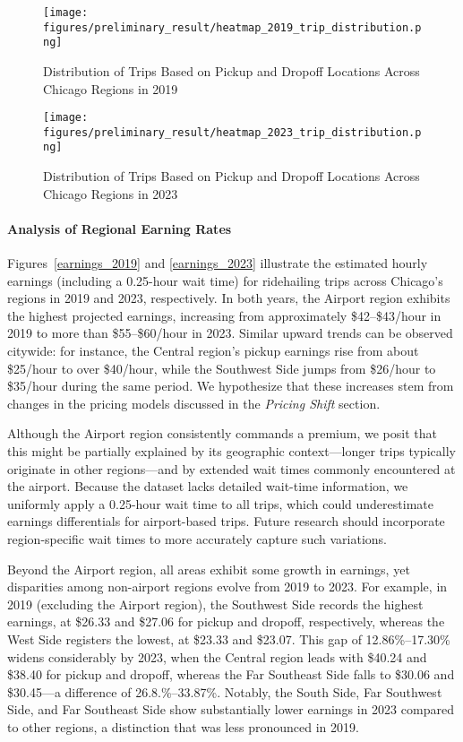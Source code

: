 \begin{figure}[h]
  \centering
  \label{distribution_2019}
  \texttt{[image: figures/preliminary\_result/heatmap\_2019\_trip\_distribution.png]}
  \caption{Distribution of Trips Based on Pickup and Dropoff Locations Across Chicago Regions in 2019}
\end{figure}

\begin{figure}[h]
  \centering
\label{distribution_2023}
  \texttt{[image: figures/preliminary\_result/heatmap\_2023\_trip\_distribution.png]}
  \caption{Distribution of Trips Based on Pickup and Dropoff Locations Across Chicago Regions in 2023}
\end{figure}
\paragraph{Analysis of Regional Earning Rates}
Figures~\ref{earnings_2019} and \ref{earnings_2023} illustrate the estimated hourly earnings (including a 0.25-hour wait time) for ridehailing trips across Chicago’s regions in 2019 and 2023, respectively. In both years, the Airport region exhibits the highest projected earnings, increasing from approximately \$42--\$43/hour in 2019 to more than \$55--\$60/hour in 2023. Similar upward trends can be observed citywide: for instance, the Central region’s pickup earnings rise from about \$25/hour to over \$40/hour, while the Southwest Side jumps from \$26/hour to \$35/hour during the same period. We hypothesize that these increases stem from changes in the pricing models discussed in the \emph{Pricing Shift} section.

Although the Airport region consistently commands a premium, we posit that this might be partially explained by its geographic context—longer trips typically originate in other regions—and by extended wait times commonly encountered at the airport. Because the dataset lacks detailed wait-time information, we uniformly apply a 0.25-hour wait time to all trips, which could underestimate earnings differentials for airport-based trips. Future research should incorporate region-specific wait times to more accurately capture such variations.

Beyond the Airport region, all areas exhibit some growth in earnings, yet disparities among non-airport regions evolve from 2019 to 2023. For example, in 2019 (excluding the Airport region), the Southwest Side records the highest earnings, at \$26.33 and \$27.06 for pickup and dropoff, respectively, whereas the West Side registers the lowest, at \$23.33 and \$23.07. This gap of 12.86\%--17.30\% widens considerably by 2023, when the Central region leads with \$40.24 and \$38.40 for pickup and dropoff, whereas the Far Southeast Side falls to \$30.06 and \$30.45—a difference of 26.8.\%--33.87\%. Notably, the South Side, Far Southwest Side, and Far Southeast Side show substantially lower earnings in 2023 compared to other regions, a distinction that was less pronounced in 2019.

